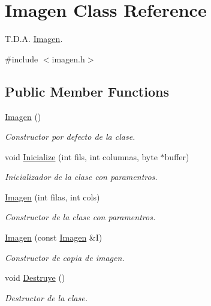 \hypertarget{class_imagen}{}\section{Imagen Class Reference}
\label{class_imagen}


T.\+D.\+A. \hyperlink{class_imagen}{Imagen}.  




{\ttfamily \#include $<$imagen.\+h$>$}

\subsection*{Public Member Functions}
\begin{DoxyCompactItemize}
\item 
\mbox{\label{class_imagen_ab2e649aa7a105155c7bfdb846abf0528}} 
\hyperlink{class_imagen_ab2e649aa7a105155c7bfdb846abf0528}{Imagen} ()
\begin{DoxyCompactList}\small\item\em Constructor por defecto de la clase. \end{DoxyCompactList}\item 
void \hyperlink{class_imagen_a0cbf4969fb5bfdd0ef60cfd390714580}{Inicialize} (int fils, int columnas, byte $\ast$buffer)
\begin{DoxyCompactList}\small\item\em Inicializador de la clase con paramentros. \end{DoxyCompactList}\item 
\hyperlink{class_imagen_ad4943ff0e2de31d4c25a879030f3ebf2}{Imagen} (int filas, int cols)
\begin{DoxyCompactList}\small\item\em Constructor de la clase con paramentros. \end{DoxyCompactList}\item 
\hyperlink{class_imagen_a5c25efc6e460f6de605942460db48057}{Imagen} (const \hyperlink{class_imagen}{Imagen} \&I)
\begin{DoxyCompactList}\small\item\em Constructor de copia de imagen. \end{DoxyCompactList}\item 
void \hyperlink{class_imagen_ab0161e7224c194d421c475eeae178708}{Destruye} ()
\begin{DoxyCompactList}\small\item\em Destructor de la clase. \end{DoxyCompactList}\item 

\end{DoxyCompactItemize}
